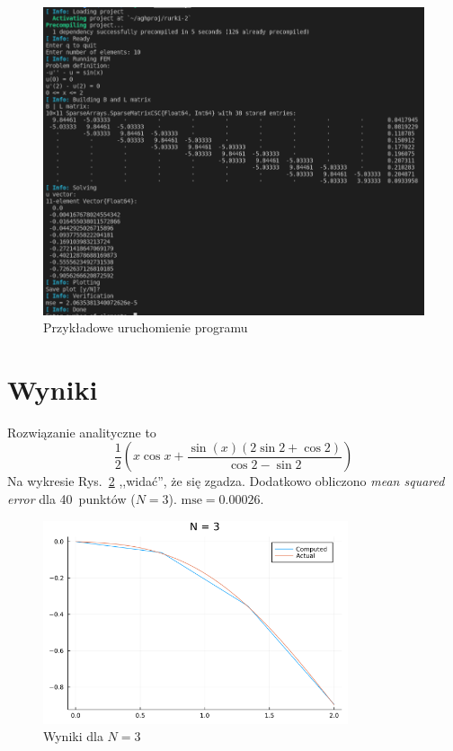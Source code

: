 \documentclass[12pt,a4paper]{mwart}
\begin{document}
\begin{figure}[h]
    \centering
    \includegraphics[width=\textwidth]{images/rurki-log.png}
    \caption{Przykładowe uruchomienie programu}
    \label{rys:rurki-log}
\end{figure}

\section{Wyniki}
Rozwiązanie analityczne to
\begin{equation*}
    \frac{1}{2} \left(x\cos{x} + \frac{\sin(x) (2\sin{2} + \cos{2})}{\cos{2} - \sin{2}}\right)
\end{equation*}
Na wykresie Rys.~\ref{rys:rurki-n3} ,,widać'', że się zgadza.
Dodatkowo obliczono \textit{mean squared error}
dla 40~punktów ($N=3$). $\text{mse} = 0.00026$.
\begin{figure}[h]
    \centering
    \includegraphics[width=0.8\textwidth]{images/rurki-n3.png}
    \caption{Wyniki dla $N=3$}
    \label{rys:rurki-n3}
\end{figure}
\end{document}
